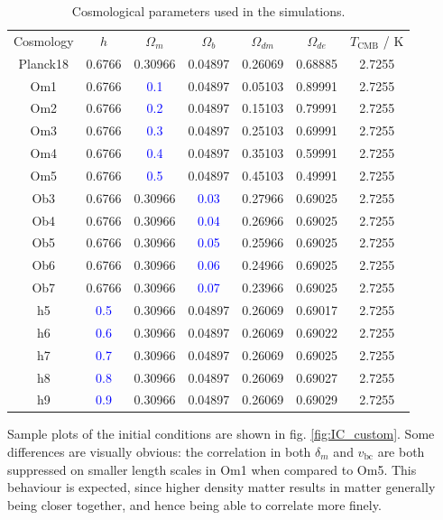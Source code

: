 \documentclass[floats,floatfix,showpacs,amssymb,prd,superscriptaddress,nofootinbib]{revtex4-2} %
\newcommand{\blue}{\textcolor{blue}}
\begin{document}
\begin{table}[H]
\centering
\begin{tabular}{c c c c c c c}
\hline
Cosmology & $h$ & $\Omega_m$ & $\Omega_b$ & $\Omega_{dm}$ & $\Omega_{de}$ & $T_{\text{CMB}}$ / K \\
\hhline{= = = = = = =}
Planck18 & 0.6766 & 0.30966 & 0.04897 & 0.26069 & 0.68885 & 2.7255 \\ \hline
Om1 & 0.6766 & \blue{0.1} & 0.04897 & 0.05103 & 0.89991 & 2.7255 \\
Om2 & 0.6766 & \blue{0.2} & 0.04897 & 0.15103 & 0.79991 & 2.7255 \\
Om3 & 0.6766 & \blue{0.3} & 0.04897 & 0.25103 & 0.69991 & 2.7255 \\
Om4 & 0.6766 & \blue{0.4} & 0.04897 & 0.35103 & 0.59991 & 2.7255 \\
Om5 & 0.6766 & \blue{0.5} & 0.04897 & 0.45103 & 0.49991 & 2.7255 \\ \hline
Ob3 & 0.6766 & 0.30966 & \blue{0.03} & 0.27966 & 0.69025 & 2.7255 \\
Ob4 & 0.6766 & 0.30966 & \blue{0.04} & 0.26966 & 0.69025 & 2.7255 \\
Ob5 & 0.6766 & 0.30966 & \blue{0.05} & 0.25966 & 0.69025 & 2.7255 \\
Ob6 & 0.6766 & 0.30966 & \blue{0.06} & 0.24966 & 0.69025 & 2.7255 \\
Ob7 & 0.6766 & 0.30966 & \blue{0.07} & 0.23966 & 0.69025 & 2.7255 \\
\hline
h5 & \blue{0.5} & 0.30966 & 0.04897 & 0.26069 & 0.69017 & 2.7255 \\
h6 & \blue{0.6} & 0.30966 & 0.04897 & 0.26069 & 0.69022 & 2.7255 \\
h7 & \blue{0.7} & 0.30966 & 0.04897 & 0.26069 & 0.69025 & 2.7255 \\
h8 & \blue{0.8} & 0.30966 & 0.04897 & 0.26069 & 0.69027 & 2.7255 \\
h9 & \blue{0.9} & 0.30966 & 0.04897 & 0.26069 & 0.69029 & 2.7255 \\
\hline

\end{tabular}
\caption{Cosmological parameters used in the simulations.}
\label{tab:IC_parameters}
\end{table}



Sample plots of the initial conditions are shown in fig. \ref{fig:IC_custom}. Some differences are visually obvious: the correlation in both $\delta_m$ and $v_{\text{bc}}$ are both suppressed on smaller length scales in Om1 when compared to Om5. This behaviour is expected, since higher density matter results in matter generally being closer together, and hence being able to correlate more finely. 
\end{document}
